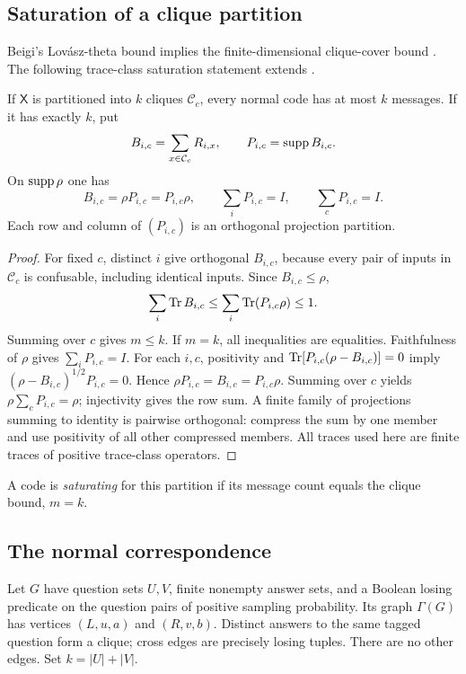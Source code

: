 \subsection{Saturation of a clique partition}
Beigi's Lov\'asz-theta bound implies the finite-dimensional clique-cover bound \cite{Beigi}. The following trace-class saturation statement extends \cite[Lemma~5]{Mancinska}.
\begin{lemma}\label{lem:saturation}
If $\mathsf X$ is partitioned into $k$ cliques $\mathcal C_c$, every normal code has at most $k$ messages. If it has exactly $k$, put
\[
 B_{i,c}=\sum_{x\in \mathcal C_c}R_{i,x},\qquad P_{i,c}=\operatorname{supp} B_{i,c}.
\]
On $\operatorname{supp}\rho$ one has
\begin{equation}\label{eq:saturation}
 B_{i,c}=\rho P_{i,c}=P_{i,c}\rho,\qquad
 \sum_iP_{i,c}=I,\qquad \sum_cP_{i,c}=I.
\end{equation}
Each row and column of $(P_{i,c})$ is an orthogonal projection partition.
\end{lemma}
\begin{proof}
For fixed $c$, distinct $i$ give orthogonal $B_{i,c}$, because every pair of inputs in $\mathcal C_c$ is confusable, including identical inputs. Since $B_{i,c}\leq\rho$,
\[
 \sum_i\operatorname{Tr} B_{i,c}\leq\sum_i\operatorname{Tr}(P_{i,c}\rho)\leq1.
\]
Summing over $c$ gives $m\leq k$. If $m=k$, all inequalities are equalities. Faithfulness of $\rho$ gives $\sum_iP_{i,c}=I$. For each $i,c$, positivity and
$\operatorname{Tr}[P_{i,c}(\rho-B_{i,c})]=0$ imply
$(\rho-B_{i,c})^{1/2}P_{i,c}=0$. Hence $\rho P_{i,c}=B_{i,c}=P_{i,c}\rho$.
Summing over $c$ yields $\rho\sum_cP_{i,c}=\rho$; injectivity gives the row sum. A finite family of projections summing to identity is pairwise orthogonal: compress the sum by one member and use positivity of all other compressed members. All traces used here are finite traces of positive trace-class operators.
\end{proof}

A code is \emph{saturating} for this partition if its message count equals the clique bound, $m=k$.

\subsection{The normal correspondence}
Let $G$ have question sets $U,V$, finite nonempty answer sets, and a Boolean losing predicate on the question pairs of positive sampling probability. Its graph $\Gamma(G)$ has vertices $(L,u,a)$ and $(R,v,b)$. Distinct answers to the same tagged question form a clique; cross edges are precisely losing tuples. There are no other edges. Set $k=|U|+|V|$.


